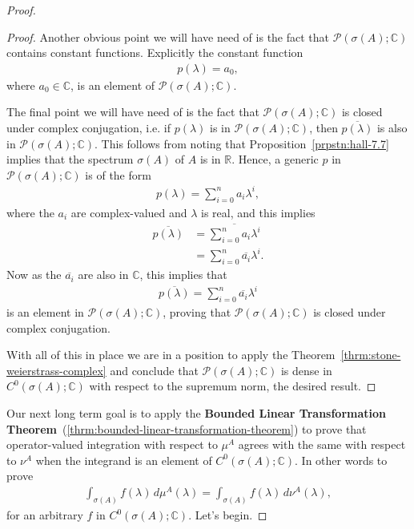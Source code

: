 \begin{proof}
\begin{proof}
Another obvious point we will have need of is the fact that $\mathcal{P}(\sigma(A); \mathbb{C})$ contains constant functions. Explicitly the constant function
\begin{align}
    p(\lambda) = a_0,
\end{align}
where $a_0 \in \mathbb{C}$, is an element of $\mathcal{P}(\sigma(A); \mathbb{C})$.

The final point we will have need of is the fact that $\mathcal{P}(\sigma(A); \mathbb{C})$ is closed under complex conjugation, i.e. if $p(\lambda)$ is in $\mathcal{P}(\sigma(A); \mathbb{C})$, then $\overline{p(\lambda)}$ is also in $\mathcal{P}(\sigma(A); \mathbb{C})$. This follows from noting that Proposition~\ref{prpstn:hall-7.7} implies that the spectrum $\sigma(A)$ of $A$ is in $\mathbb{R}$. Hence, a generic $p$ in $\mathcal{P}(\sigma(A); \mathbb{C})$ is of the form
\begin{align}
    p(\lambda) = \sum_{i=0}^n a_i \lambda^i,
\end{align}
where the $a_i$ are complex-valued and $\lambda$ is real, and this implies
\begin{align}
    \overline{p(\lambda)} &= \overline{\sum_{i=0}^n a_i \lambda^i} \\
                          &= \sum_{i=0}^n \overline{a_i} \lambda^i.
\end{align}
Now as the $\overline{a_i}$ are also in $\mathbb{C}$, this implies that
\begin{align}
    \overline{p(\lambda)} = \sum_{i=0}^n \overline{a_i} \lambda^i
\end{align}
is an element in $\mathcal{P}(\sigma(A); \mathbb{C})$, proving that $\mathcal{P}(\sigma(A); \mathbb{C})$ is closed under complex conjugation.

With all of this in place we are in a position to apply the Theorem~\ref{thrm:stone-weierstrass-complex} and conclude that $\mathcal{P}(\sigma(A); \mathbb{C})$ is dense in $C^0(\sigma(A); \mathbb{C})$ with respect to the supremum norm, the desired result.
\end{proof}

Our next long term goal is to apply the \textbf{Bounded Linear Transformation Theorem}~(\ref{thrm:bounded-linear-transformation-theorem}) to prove that operator-valued integration with respect to $\mu^A$ agrees with the same with respect to $\nu^A$ when the integrand is an element of $C^0(\sigma(A); \mathbb{C})$. In other words to prove
\begin{align}
    \int_{\sigma(A)} f(\lambda) \, d\mu^A(\lambda) = \int_{\sigma(A)} f(\lambda) \, d\nu^A(\lambda),
\end{align}
for an arbitrary $f$ in $C^0(\sigma(A); \mathbb{C})$. Let's begin.


\end{proof}
